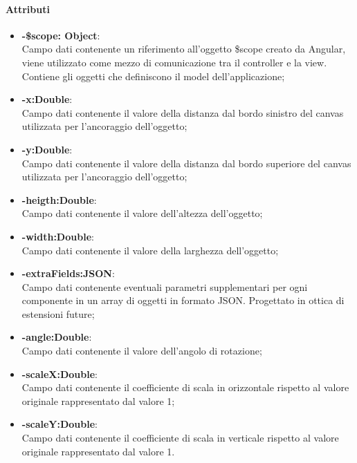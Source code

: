 	\paragraph{Attributi}
	\begin{itemize}
		\item \textbf{-\$scope: Object}:\\
			Campo dati contenente un riferimento all'oggetto \$scope creato da Angular, viene utilizzato come mezzo di comunicazione tra il controller e la view. Contiene gli oggetti che definiscono il model dell'applicazione;
		\item\textbf{-x:Double}:\\
			Campo dati contenente il valore della distanza dal bordo sinistro del canvas utilizzata per l'ancoraggio dell'oggetto;
		\item\textbf{-y:Double}:\\
			Campo dati contenente il valore della distanza dal bordo superiore del canvas utilizzata per l'ancoraggio dell'oggetto;
		\item\textbf{-heigth:Double}:\\
			Campo dati contenente il valore dell'altezza dell'oggetto;
		\item\textbf{-width:Double}:\\
			Campo dati contenente il valore della larghezza dell'oggetto;
		\item\textbf{-extraFields:JSON}:\\
			Campo dati contenente eventuali parametri supplementari per ogni componente in un array di oggetti in formato JSON. Progettato in ottica di estensioni future; 
		\item\textbf{-angle:Double}:\\	
			Campo dati contenente il valore dell'angolo di rotazione;
		\item\textbf{-scaleX:Double}:\\
			Campo dati contenente il coefficiente di scala in orizzontale rispetto al valore originale rappresentato dal valore 1;
		\item\textbf{-scaleY:Double}:\\	
			Campo dati contenente il coefficiente di scala in verticale rispetto al valore originale rappresentato dal valore 1.
	
	\end{itemize}
	
